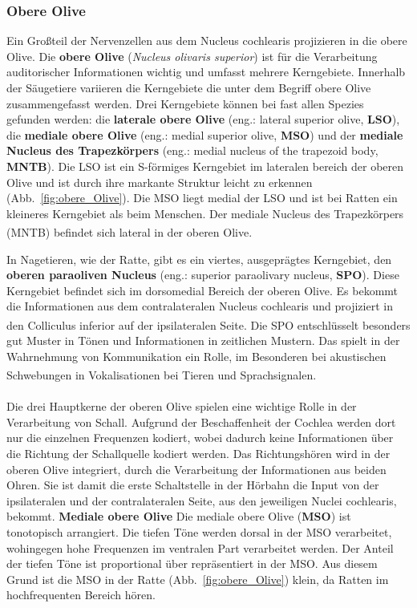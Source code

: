 \documentclass[12pt,a4paper,pdftex]{article}
\begin{document}
\subsubsection*{Obere Olive}
Ein Großteil der Nervenzellen aus dem Nucleus cochlearis projizieren in die obere Olive. Die \textbf{obere Olive} (\textit{Nucleus olivaris superior}) ist für die Verarbeitung auditorischer Informationen wichtig und umfasst mehrere Kerngebiete. Innerhalb der Säugetiere variieren die Kerngebiete die unter dem Begriff obere Olive zusammengefasst werden. Drei Kerngebiete können bei fast allen Spezies gefunden werden: die \textbf{laterale obere Olive} (eng.: lateral superior olive, \textbf{LSO}), die \textbf{mediale obere Olive} (eng.: medial superior olive, \textbf{MSO}) und der \textbf{mediale Nucleus des Trapezkörpers} (eng.: medial nucleus of the trapezoid body, \textbf{MNTB}). Die LSO ist ein S-förmiges Kerngebiet im lateralen bereich der oberen Olive und ist durch ihre markante Struktur leicht zu erkennen (Abb.~\ref{fig:obere_Olive}). Die MSO liegt medial der LSO und ist bei Ratten ein kleineres Kerngebiet als beim Menschen. Der mediale Nucleus des Trapezkörpers (MNTB) befindet sich lateral in der oberen Olive\textsuperscript{\cite[29]{paxinos2014rat}}.

In Nagetieren, wie der Ratte, gibt es ein viertes, ausgeprägtes Kerngebiet, den \textbf{oberen paraoliven Nucleus} (eng.: superior paraolivary nucleus, \textbf{SPO}). Diese Kerngebiet befindet sich im dorsomedial Bereich der oberen Olive. Es bekommt die Informationen aus dem contralateralen Nucleus cochlearis und projiziert in den Colliculus inferior auf der ipsilateralen Seite\textsuperscript{\cite[29]{paxinos2014rat}}. Die SPO entschlüsselt besonders gut Muster in Tönen und Informationen in zeitlichen Mustern. Das spielt in der Wahrnehmung von Kommunikation ein Rolle, im Besonderen bei akustischen Schwebungen in Vokalisationen bei Tieren und Sprachsignalen\textsuperscript{\cite[29]{paxinos2014rat}}. 
\\\\

\noindent Die drei Hauptkerne der oberen Olive spielen eine wichtige Rolle in der Verarbeitung von Schall. Aufgrund der Beschaffenheit der Cochlea werden dort nur die einzelnen Frequenzen kodiert, wobei dadurch keine Informationen über die Richtung der Schallquelle kodiert werden. Das Richtungshören wird in der oberen Olive integriert, durch die Verarbeitung der Informationen aus beiden Ohren. Sie ist damit die erste Schaltstelle in der Hörbahn die Input von der ipsilateralen und der contralateralen Seite, aus den jeweiligen Nuclei cochlearis, bekommt.
\newpage
\textbf{Mediale obere Olive}
\noindent Die mediale obere Olive (\textbf{MSO}) ist tonotopisch arrangiert. Die tiefen Töne werden dorsal in der MSO verarbeitet, wohingegen hohe Frequenzen im ventralen Part verarbeitet werden. Der Anteil der tiefen Töne ist proportional über repräsentiert in der MSO. Aus diesem Grund ist die MSO in der Ratte (Abb.~\ref{fig:obere_Olive}) klein, da Ratten im hochfrequenten Bereich hören.
\end{document}
